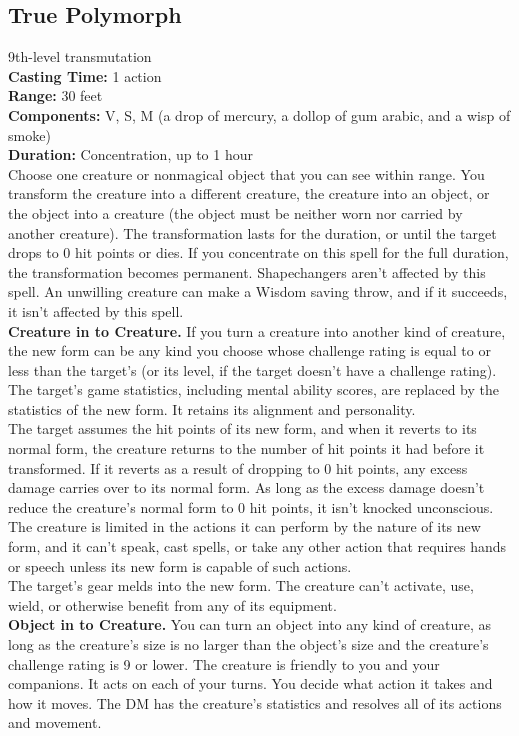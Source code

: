 \documentclass[11pt, A4paper, english]{article}
\begin{document}
		\subsection{True Polymorph}
9th-level transmutation \\
\textbf{Casting Time:} 1 action \\
\textbf{Range:} 30 feet \\
\textbf{Components:} V, S, M (a drop of mercury, a dollop of gum arabic, and a wisp of smoke) \\
\textbf{Duration:} Concentration, up to 1 hour \\
Choose one creature or nonmagical object that you can see within range. You transform the creature into a different creature, the creature into an object, or the object into a creature (the object must be neither worn nor carried by another creature). The transformation lasts for the duration, or until the target drops to 0 hit points or dies. If you concentrate on this spell for the full duration, the transformation becomes permanent. Shapechangers aren’t affected by this spell. An unwilling creature can make a Wisdom saving throw, and if it succeeds, it isn’t affected by this spell. \\
\textbf{Creature in to Creature.} If you turn a creature into another kind of creature, the new form can be any kind you choose whose challenge rating is equal to or less than the target’s (or its level, if the target doesn’t have a challenge rating). The target’s game statistics, including mental ability scores, are replaced by the statistics of the new form. It retains its alignment and personality. \\
The target assumes the hit points of its new form, and when it reverts to its normal form, the creature returns to the number of hit points it had before it transformed. If it reverts as a result of dropping to 0 hit points, any excess damage carries over to its normal form. As long as the excess damage doesn’t reduce the creature’s normal form to 0 hit points, it isn’t knocked unconscious. \\
The creature is limited in the actions it can perform by the nature of its new form, and it can’t speak, cast spells, or take any other action that requires hands or speech unless its new form is capable of such actions. \\
The target’s gear melds into the new form. The creature can’t activate, use, wield, or otherwise benefit from any of its equipment. \\
\textbf{Object in to Creature.} You can turn an object into any kind of creature, as long as the creature’s size is no larger than the object’s size and the creature’s challenge rating is 9 or lower. The creature is friendly to you and your companions. It acts on each of your turns. You decide what action it takes and how it moves. The DM has the creature’s statistics and resolves all of its actions and movement. \\
\end{document}
